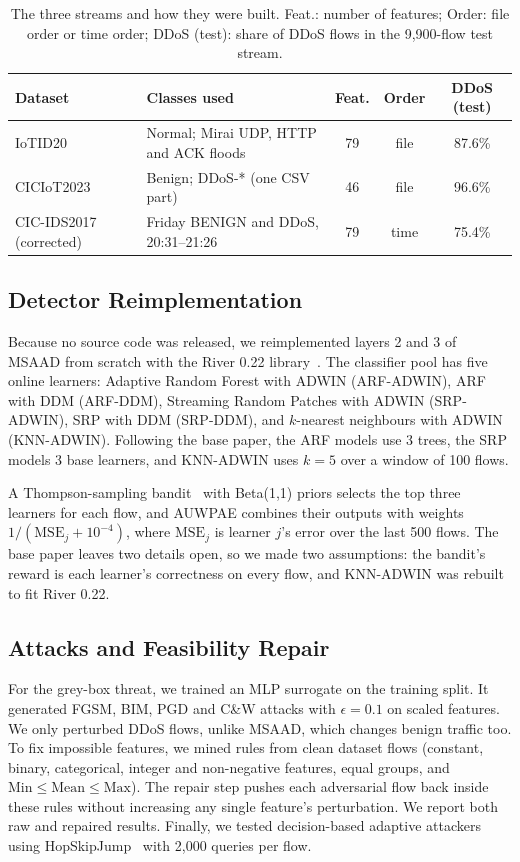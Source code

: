 \documentclass[conference]{IEEEtran}
\begin{document}
\begin{table}[t]
\caption{The three streams and how they were built. Feat.: number of features; Order: file order or time order; DDoS (test): share of DDoS flows in the 9{,}900-flow test stream.}
\label{tab:datasets}
\centering
\footnotesize
\setlength{\tabcolsep}{3pt}
\begin{tabular}{@{}p{1.55cm}p{3.15cm}ccc@{}}
\toprule
Dataset & Classes used & Feat. & Order & DDoS (test) \\
\midrule
IoTID20 & Normal; Mirai UDP, HTTP and ACK floods & 79 & file & 87.6\% \\
CICIoT2023 & Benign; DDoS-* (one CSV part) & 46 & file & 96.6\% \\
CIC-IDS2017 (corrected) & Friday BENIGN and DDoS, 20:31--21:26 & 79 & time & 75.4\% \\
\bottomrule
\end{tabular}
\end{table}

\subsection{Detector Reimplementation}
Because no source code was released, we reimplemented layers 2 and 3 of MSAAD
from scratch with the River 0.22 library~\cite{montiel2021river}. The
classifier pool has five online learners: Adaptive Random Forest with ADWIN
(ARF-ADWIN), ARF with DDM (ARF-DDM), Streaming Random Patches with ADWIN
(SRP-ADWIN), SRP with DDM (SRP-DDM), and $k$-nearest neighbours with ADWIN
(KNN-ADWIN). Following the base paper, the ARF models use 3 trees, the SRP
models 3 base learners, and KNN-ADWIN uses $k=5$ over a window of 100 flows.

A Thompson-sampling bandit~\cite{chapelle2011thompson} with Beta(1,1) priors
selects the top three learners for each flow, and AUWPAE combines their outputs
with weights $1/(\mathrm{MSE}_j + 10^{-4})$, where $\mathrm{MSE}_j$ is learner
$j$'s error over the last 500 flows. The base paper leaves two details open, so
we made two assumptions: the bandit's reward is each learner's correctness on
every flow, and KNN-ADWIN was rebuilt to fit River 0.22.

\subsection{Attacks and Feasibility Repair}\label{sec:attacks}
For the grey-box threat, we trained an MLP surrogate on the training split. It
generated FGSM, BIM, PGD and C\&W attacks with $\epsilon = 0.1$ on scaled
features. We only perturbed DDoS flows, unlike MSAAD, which changes benign
traffic too. To fix impossible features, we mined rules from clean dataset
flows (constant, binary, categorical, integer and non-negative features, equal
groups, and $\mathrm{Min} \le \mathrm{Mean} \le \mathrm{Max}$). The repair step
pushes each adversarial flow back inside these rules without increasing any
single feature's perturbation. We report both raw and repaired results.
Finally, we tested decision-based adaptive attackers using
HopSkipJump~\cite{chen2020hsj} with 2{,}000 queries per flow.
\end{document}
